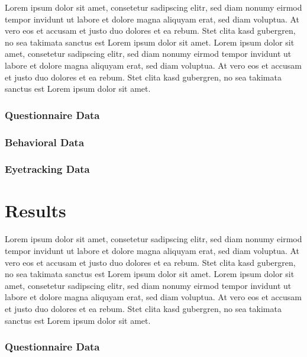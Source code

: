 \documentclass[
  english,
  man,floatsintext]{apa6}
\begin{document}
Lorem ipsum dolor sit amet, consetetur sadipscing elitr, sed diam nonumy eirmod tempor invidunt ut labore et dolore magna aliquyam erat, sed diam voluptua. At vero eos et accusam et justo duo dolores et ea rebum. Stet clita kasd gubergren, no sea takimata sanctus est Lorem ipsum dolor sit amet. Lorem ipsum dolor sit amet, consetetur sadipscing elitr, sed diam nonumy eirmod tempor invidunt ut labore et dolore magna aliquyam erat, sed diam voluptua. At vero eos et accusam et justo duo dolores et ea rebum. Stet clita kasd gubergren, no sea takimata sanctus est Lorem ipsum dolor sit amet.

\hypertarget{questionnaire-data-2}{%
\subsubsection{Questionnaire Data}\label{questionnaire-data-2}}

\hypertarget{behavioral-data-2}{%
\subsubsection{Behavioral Data}\label{behavioral-data-2}}

\hypertarget{eyetracking-data-2}{%
\subsubsection{Eyetracking Data}\label{eyetracking-data-2}}

\hypertarget{results}{%
\section{Results}\label{results}}

Lorem ipsum dolor sit amet, consetetur sadipscing elitr, sed diam nonumy eirmod tempor invidunt ut labore et dolore magna aliquyam erat, sed diam voluptua. At vero eos et accusam et justo duo dolores et ea rebum. Stet clita kasd gubergren, no sea takimata sanctus est Lorem ipsum dolor sit amet. Lorem ipsum dolor sit amet, consetetur sadipscing elitr, sed diam nonumy eirmod tempor invidunt ut labore et dolore magna aliquyam erat, sed diam voluptua. At vero eos et accusam et justo duo dolores et ea rebum. Stet clita kasd gubergren, no sea takimata sanctus est Lorem ipsum dolor sit amet.

\hypertarget{questionnaire-data-3}{%
\subsubsection{Questionnaire Data}\label{questionnaire-data-3}}
\end{document}
